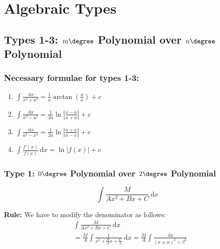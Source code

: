 \section{Algebraic Types}
  \subsection{Types 1-3: $m\degree$ Polynomial over $n\degree$ Polynomial}
    \subsubsection{Necessary formulae for types 1-3:}
      \begin{enumerate}
        \item $\int\! \frac{\ \mathrm{d}x}{x^2 + a^2} = \frac{1}{a} \arctan(\frac{x}{a}) + c$
        \item $\int\! \frac{\ \mathrm{d}x}{x^2 - a^2}= \frac{1}{2a} \ln |\frac{x-a}{x+a}| + c$
        \item $\int\! \frac{\ \mathrm{d}x}{a^2 - x^2} = \frac{1}{2a} \ln |\frac{a+x}{a-x}| + c$
        \item $\int\! \frac{f'(x)}{f(x)} \ \mathrm{d}x = \ln |f(x)| + c$
      \end{enumerate}

    \subsubsection{Type 1: $0\degree$ Polynomial over $2\degree$ Polynomial}
      
      \begin{equation*}
        \int\! \frac{M}{Ax^2 + Bx + C} \ \mathrm{d}x
      \end{equation*}
      
      \begin{center}
        \textbf{Rule:} We have to modify the denominator as follows: \begin{align*}
          & \int\! \frac{M}{Ax^2 + Bx + C} \ \mathrm{d}x \\
          & = \frac{M}{A} \int\! \frac{1}{x^2 + \frac{B}{A} x + \frac{C}{A}} \ \mathrm{d}x
          = \frac{M}{A} \int\! \frac{\ \mathrm{d}x}{(x \pm \alpha)^2 + \beta^2}
        \end{align*}
      \end{center}
      
